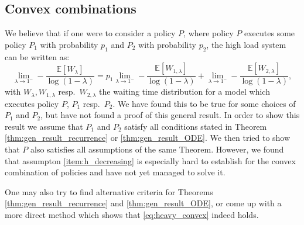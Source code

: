\documentclass[12pt]{report}
\newcommand{\E}{\mathbb{E}}
\begin{document}
\subsection{Convex combinations}
We believe that if one were to consider a policy $P$, where policy $P$ executes some policy $P_1$ with probability $p_1$ and $P_2$ with probability $p_2$, the high load system can be written as:
\begin{equation} \label{eq:heavy_convex}
\lim_{\lambda \rightarrow 1^-} -\frac{\E[W_\lambda]}{\log(1-\lambda)}
=
p_1\lim_{\lambda \rightarrow 1^-} -\frac{\E[W_{1,\lambda}]}{\log(1-\lambda)}
+
\lim_{\lambda \rightarrow 1^-} -\frac{\E[W_{2, \lambda}]}{\log(1-\lambda)},
\end{equation}
with $W_\lambda, W_{1, \lambda}$ resp.~$W_{2,\lambda}$ the waiting time distribution for a model which executes policy $P$, $P_1$ resp.~$P_2$. We have found this to be true for some choices of $P_1$ and $P_2$, but have not found a proof of this general result. 
In order to show this result we assume that $P_1$ and $P_2$ satisfy all conditions stated in Theorem \ref{thm:gen_result_recurrence} or \ref{thm:gen_result_ODE}. We then tried to show that $P$ also satisfies all assumptions of the same Theorem. However, we found that assumpton \ref{item:h_decreasing} is especially hard to establish for the convex combination of policies and have not yet managed to solve it.

One may also try to find alternative criteria for Theorems \ref{thm:gen_result_recurrence} and \ref{thm:gen_result_ODE}, or come up with a more direct method which shows that \eqref{eq:heavy_convex} indeed holds.
\end{document}
